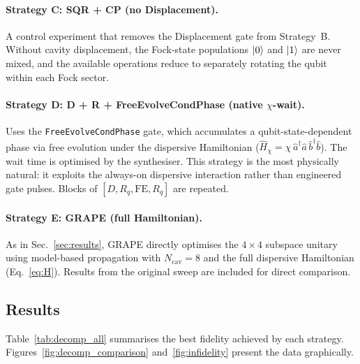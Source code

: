 \documentclass[aps,pra,twocolumn,reprint,floatfix,amsmath,amssymb]{revtex4-2}
\begin{document}
\paragraph{Strategy C: SQR + CP (no Displacement).}
A control experiment that removes the Displacement gate from
Strategy~B.  Without cavity displacement, the Fock-state populations
$\ket{0}$ and $\ket{1}$ are never mixed, and the available operations
reduce to separately rotating the qubit within each Fock sector.

\paragraph{Strategy D: D + R + FreeEvolveCondPhase (native $\chi$-wait).}
Uses the \texttt{FreeEvolveCondPhase} gate, which accumulates a
qubit-state-dependent phase via free evolution under the dispersive
Hamiltonian ($\hat{H}_\chi=\chi\,\hat{a}^\dagger\hat{a}\,
\hat{b}^\dagger\hat{b}$).  The wait time is optimised by the
synthesiser.  This strategy is the most physically natural:
it exploits the always-on dispersive interaction rather than
engineered gate pulses.  Blocks of
$[D, R_q, \mathrm{FE}, R_q]$ are repeated.

\paragraph{Strategy E: GRAPE (full Hamiltonian).}
As in Sec.~\ref{sec:results}, GRAPE directly optimises the
$4\times4$ subspace unitary using model-based propagation with
$N_\mathrm{cav}=8$ and the full dispersive Hamiltonian
(Eq.~\ref{eq:H}).  Results from the original sweep are included
for direct comparison.

\subsection{Results}

Table~\ref{tab:decomp_all} summarises the best fidelity achieved by
each strategy.  Figures~\ref{fig:decomp_comparison}
and~\ref{fig:infidelity} present the data graphically.
\end{document}
